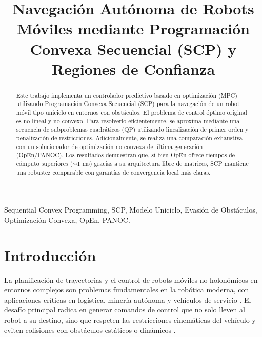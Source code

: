 \documentclass[conference]{IEEEtran}
\begin{document}
\title{Navegación Autónoma de Robots Móviles mediante Programación Convexa Secuencial (SCP) y Regiones de Confianza}

\author{
}

\maketitle

\begin{abstract}
Este trabajo implementa un controlador predictivo basado en optimización (MPC) utilizando Programación Convexa Secuencial (SCP) para la navegación de un robot móvil tipo uniciclo en entornos con obstáculos. El problema de control óptimo original es no lineal y no convexo. Para resolverlo eficientemente, se aproxima mediante una secuencia de subproblemas cuadráticos (QP) utilizando linealización de primer orden y penalización de restricciones. Adicionalmente, se realiza una comparación exhaustiva con un solucionador de optimización no convexa de última generación (OpEn/PANOC). Los resultados demuestran que, si bien OpEn ofrece tiempos de cómputo superiores ($\sim$1 ms) gracias a su arquitectura libre de matrices, SCP mantiene una robustez comparable con garantías de convergencia local más claras.
\end{abstract}

\begin{IEEEkeywords}
Sequential Convex Programming, SCP, Modelo Uniciclo, Evasión de Obstáculos, Optimización Convexa, OpEn, PANOC.
\end{IEEEkeywords}

\section{Introducción}

La planificación de trayectorias y el control de robots móviles no holonómicos en entornos complejos son problemas fundamentales en la robótica moderna, con aplicaciones críticas en logística, minería autónoma y vehículos de servicio \cite{siegwart}. El desafío principal radica en generar comandos de control que no solo lleven al robot a su destino, sino que respeten las restricciones cinemáticas del vehículo y eviten colisiones con obstáculos estáticos o dinámicos \cite{lavalle}.
\end{document}
